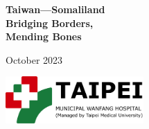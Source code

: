 \documentclass{article}
\begin{document}
\begin{titlepage}

\hspace*{-0.7cm}%
\begin{tikzpicture} %


\hspace{1.4cm}
%

\end{tikzpicture}
    \vspace{2cm}
    
\centering
    {\Huge\bfseries Taiwan---Somaliland \\
    Bridging Borders,\\ Mending Bones  \par } %
    \vspace{1.5cm}
    {\Large October 2023\par}


\vspace{2.0cm}
%


\vspace{1.5cm}


\includegraphics[height=1.8cm]{TMWH_logo_TAIPEI_vector.pdf}

 




\end{titlepage}
\end{document}
